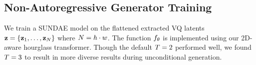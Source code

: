 \subsection{Non-Autoregressive Generator Training}


We train a SUNDAE model on the flattened extracted VQ latents $\mathbf{z} =
\{\mathbf{z}_1, \dots, \mathbf{z}_N\}$ where $N = h
\cdot w$. The function $f_\theta$ is implemented using our 2D-aware
hourglass transformer. Though the default $T = 2$ performed well, we
found $T = 3$ to result in more diverse results during unconditional
generation.



